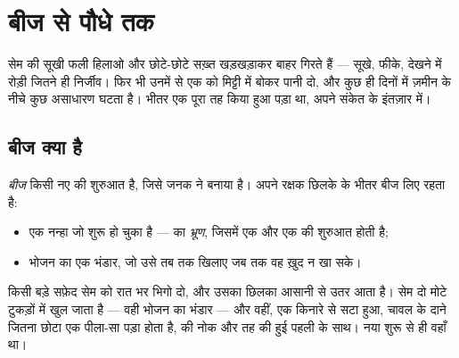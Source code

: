 \chapter{बीज से पौधे तक}\label{ch:g2:from-seed-to-plant}

सेम की सूखी फली हिलाओ और छोटे-छोटे सख़्त  खड़खड़ाकर बाहर गिरते हैं
--- सूखे, फीके, देखने में रोड़ी जितने ही निर्जीव। फिर भी उनमें से एक
को मिट्टी में बोकर पानी दो, और कुछ ही दिनों में ज़मीन के नीचे कुछ
असाधारण घटता है। भीतर एक पूरा  तह किया हुआ पड़ा था, अपने संकेत के
इंतज़ार में।

\section{बीज क्या है}

\begin{definition}[बीज]\label{def:g2:from-seed-to-plant:seed}
\emph{बीज} किसी नए  की शुरुआत है, जिसे जनक  ने
बनाया है। अपने रक्षक छिलके के भीतर बीज लिए रहता है:
\begin{itemize}
  \item एक नन्हा  जो शुरू हो चुका है ---  का
        \emph{भ्रूण}, जिसमें एक  और एक
         की शुरुआत होती है;
  \item भोजन का एक भंडार, जो उसे तब तक खिलाए जब तक वह ख़ुद न खा सके।
\end{itemize}
\end{definition}

\begin{example}[भिगोया सेम खोलना]\label{ex:g2:from-seed-to-plant:open}
किसी बड़े सफ़ेद सेम को रात भर भिगो दो, और उसका छिलका आसानी से उतर आता
है। सेम दो मोटे टुकड़ों में खुल जाता है --- वही भोजन का भंडार --- और
वहीं, एक किनारे से सटा हुआ, चावल के दाने जितना छोटा एक पीला-सा 
पड़ा होता है,  की नोक और तह की हुई पहली  के साथ। नया 
शुरू से ही वहाँ था।
\end{example}

